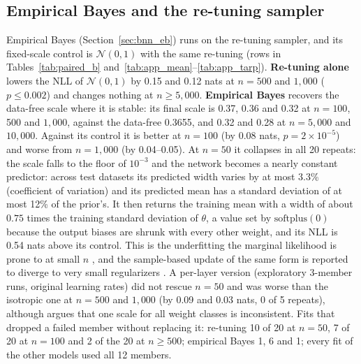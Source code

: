 \documentclass[11pt]{article}
\begin{document}
\subsection{Empirical Bayes and the re-tuning sampler}
\label{app:eb}
\label{sec:res_side}
Empirical Bayes (Section~\ref{sec:bnn_eb}) runs on the re-tuning sampler, and its fixed-scale control is
$\mathcal N(0,1)$ with the same re-tuning (rows in Tables~\ref{tab:paired_b} and~\ref{tab:app_mean}--\ref{tab:app_tarp}).
\textbf{Re-tuning alone} lowers the NLL of $\mathcal N(0,1)$ by 0.15 and 0.12 nats at $n=500$ and $1{,}000$ ($p\le0.002$)
and changes nothing at $n\ge5{,}000$. \textbf{Empirical Bayes} recovers the data-free scale where it is stable: its final
scale is 0.37, 0.36 and 0.32 at $n=100$, 500 and $1{,}000$, against the data-free 0.3655, and 0.32 and 0.28 at $n=5{,}000$
and $10{,}000$. Against its control it is better at $n=100$ (by 0.08 nats, $p=2\times10^{-5}$) and worse from $n=1{,}000$
(by 0.04--0.05). At $n=50$ it collapses in all 20 repeats: the scale falls to the floor of $10^{-3}$ and the network
becomes a nearly constant predictor: across test datasets its predicted width varies by at most 3.3\% (coefficient of
variation) and its predicted mean has a standard deviation of at most 12\% of the prior's. It then returns the training mean with a width of about $0.75$ times the training
standard deviation of $\theta$, a value set by $\mathrm{softplus}(0)$ because the output biases are shrunk with every
other weight, and its NLL is 0.54 nats above its control. This is the underfitting the marginal likelihood is prone to
at small $n$ \citep{lotfi2022bayesian}, and the sample-based update of the same form is reported to diverge to very small
regularizers \citep{antoran2023sampling}. A per-layer version (exploratory 3-member runs, original learning rates) did
not rescue $n=50$ and was worse than the isotropic one at $n=500$ and $1{,}000$ (by 0.09 and 0.03 nats, 0 of 5 repeats),
although \citet{mackay1992thesis} argues that one scale for all weight classes is inconsistent. Fits that dropped a failed
member without replacing it: re-tuning 10 of 20 at $n=50$, 7 of 20 at $n=100$ and 2 of the 20 at $n\ge500$; empirical
Bayes 1, 6 and 1;
every fit of the other models used all 12 members.
\end{document}
